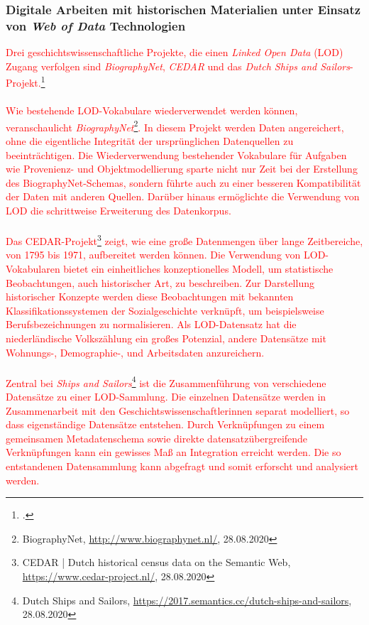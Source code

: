 \documentclass[12pt,a4paper]{article}
\begin{document}
\subsubsection{Digitale Arbeiten mit historischen Materialien unter Einsatz von \textit{Web of Data} Technologien}
\textcolor{red}{
Drei geschichtswissenschaftliche Projekte, die einen \textit{Linked Open Data} (LOD) Zugang verfolgen sind \textit{BiographyNet}, \textit{CEDAR} und das \textit{Dutch Ships and Sailors}-Projekt.\footcite[][S.5-22]{de2016linked}
\\
\\
Wie bestehende LOD-Vokabulare wiederverwendet werden können, veranschaulicht \textit{BiographyNet}\footnote{BiographyNet, \url{http://www.biographynet.nl/}, 28.08.2020}. In diesem Projekt werden Daten angereichert, ohne die eigentliche Integrität der ursprünglichen Datenquellen zu beeinträchtigen. Die Wiederverwendung bestehender Vokabulare für Aufgaben wie Provenienz- und Objektmodellierung sparte nicht nur Zeit bei der Erstellung des BiographyNet-Schemas, sondern führte auch zu einer besseren Kompatibilität der Daten mit anderen Quellen. Darüber hinaus ermöglichte die Verwendung von LOD die schrittweise Erweiterung des Datenkorpus.
\\
\\
Das CEDAR-Projekt\footnote{CEDAR | Dutch historical census data on the Semantic Web, \url{https://www.cedar-project.nl/}, 28.08.2020} zeigt, wie eine große Datenmengen über lange Zeitbereiche, von 1795 bis 1971, aufbereitet werden können. Die Verwendung von LOD-Vokabularen bietet ein einheitliches konzeptionelles Modell, um statistische Beobachtungen, auch historischer Art, zu beschreiben. Zur Darstellung historischer Konzepte werden diese Beobachtungen mit bekannten Klassifikationssystemen der Sozialgeschichte verknüpft, um beispielsweise Berufsbezeichnungen zu normalisieren. Als LOD-Datensatz hat die niederländische Volkszählung ein großes Potenzial, andere Datensätze mit Wohnungs-, Demographie-, und Arbeitsdaten anzureichern.
\\
\\ 
Zentral bei \textit{Ships and Sailors}\footnote{Dutch Ships and Sailors, \url{https://2017.semantics.cc/dutch-ships-and-sailors}, 28.08.2020} ist die Zusammenführung von verschiedene Datensätze zu einer LOD-Sammlung. Die einzelnen Datensätze werden in Zusammenarbeit mit den Geschichtswissenschaftlerinnen separat modelliert, so dass eigenständige Datensätze entstehen. Durch Verknüpfungen zu einem gemeinsamen Metadatenschema sowie direkte datensatzübergreifende Verknüpfungen kann ein gewisses Maß an Integration erreicht werden. Die so entstandenen Datensammlung kann abgefragt und somit erforscht und analysiert werden.  
}
\end{document}
